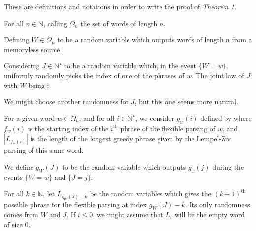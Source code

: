 \hypertarget{definitions}{}

\noindent
These are definitions and notations in order
to write the proof of \emph{Theorem 1}.

\begin{df}
For all $n\in\mathbb{N}$, calling $\Omega_n$ the set 
of words of length $n$.
\end{df}

\begin{df}
Defining $W \in \Omega_n$ to be a random variable which outputs 
words of length $n$ from a memoryless source.
\end{df}

\begin{df}
Considering $J \in \mathbb{N}^{\star}$ to be a random
variable which, in the event $\{ W = w \}$,
uniformly randomly picks the index of
one of the phrases of $w$.
The joint law of $J$ with $W$ being :

\end{df}

\begin{rmk}
We might choose another randomness for $J$, but this one seems
more natural.
\end{rmk}

\begin{df}
For a given word $w\in\Omega_n$, 
and for all $i\in\mathbb{N}^{\star}$, 
we consider $g_w(i)$ defined by
where $f_w(i)$ is the starting index
of the $i^{\text{th}}$ phrase of the flexible parsing of $w$,
and $|L_{f_w(i)}|$ is the length of the longest greedy phrase
given by the Lempel-Ziv parsing of this same word.
\end{df}

\begin{df}
We define $g_{\scriptscriptstyle W}(J)$ to be the random variable which
outputs $g_w(j)$ during the events $\{ W=w \}$ and $\{ J = j \}$.
\end{df}

\begin{df}
For all $k \in \mathbb{N}$, let $L_{g_{\scriptscriptstyle W}(J) - k}$ be the random
variables which gives the $(k+1)^{\text{th}}$ possible phrase 
for the flexible parsing at index $g_{\scriptscriptstyle W}(J) - k$. 
Its only randomness comes from $W$ and $J$. 
If $i\leq 0$, we might assume that $L_i$ will be the empty word of 
size 0.
\end{df}


